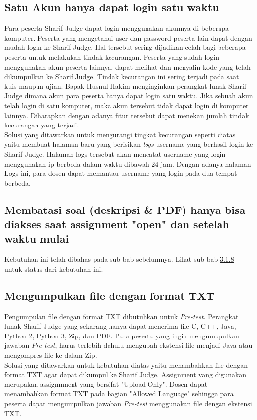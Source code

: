 \subsection{Satu Akun hanya dapat login satu waktu}
Para peserta Sharif Judge dapat login menggunakan akunnya di beberapa komputer. Peserta yang mengetahui user dan password peserta lain dapat dengan mudah login ke Sharif Judge. Hal tersebut sering dijadikan celah bagi beberapa peserta untuk melakukan tindak kecurangan. Peserta yang sudah login menggunakan akun peserta lainnya, dapat melihat dan menyalin kode yang telah dikumpulkan ke Sharif Judge. Tindak kecurangan ini sering terjadi pada saat kuis maupun ujian. Bapak Husnul Hakim menginginkan perangkat lunak Sharif Judge dimana akun para peserta hanya dapat login satu waktu. Jika sebuah akun telah login di satu komputer, maka akun tersebut tidak dapat login di komputer lainnya. Diharapkan dengan adanya fitur tersebut dapat menekan jumlah tindak kecurangan yang terjadi. \\
Solusi yang ditawarkan untuk mengurangi tingkat kecurangan seperti diatas yaitu membuat halaman baru yang berisikan \textit{logs} username yang berhasil login ke Sharif Judge. Halaman logs tersebut akan mencatat username yang login menggunakan ip berbeda dalam waktu dibawah 24 jam. Dengan adanya halaman Logs ini, para dosen dapat memantau username yang login pada dua tempat berbeda.	

\subsection{Membatasi soal (deskripsi \& PDF) hanya bisa diakses saat assignment "open" dan setelah waktu mulai}
Kebutuhan ini telah dibahas pada sub bab sebelumnya. Lihat sub bab \hyperref[subsec:membatasisoal]{3.1.8} untuk status dari kebutuhan ini.

\subsection{Mengumpulkan file dengan format TXT}
\label{subsec:filetxt}
Pengumpulan file dengan format TXT dibutuhkan untuk \textit{Pre-test}. Perangkat lunak Sharif Judge yang sekarang hanya dapat menerima file C, C++, Java, Python 2, Python 3, Zip, dan PDF. Para peserta yang ingin mengumupulkan jawaban \textit{Pre-test}, harus terlebih dahulu mengubah ekstensi file menjadi Java atau mengompres file ke dalam Zip. \\
Solusi yang ditawarkan untuk kebutuhan diatas yaitu menambahkan file dengan format TXT agar dapat dikumpul ke Sharif Judge. Assignment yang digunakan merupakan assignmnent yang bersifat "Upload Only". Dosen dapat menambahkan format TXT pada bagian "Allowed Language" sehingga para peserta dapat mengumpulkan jawaban \textit{Pre-test} menggunakan file dengan ekstensi TXT.

